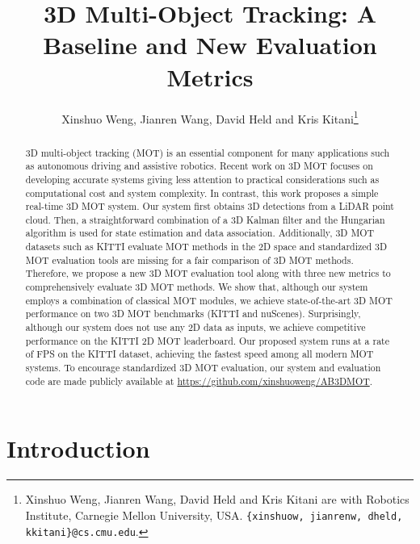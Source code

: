 \documentclass[letterpaper, 10 pt, conference]{ieeeconf}
\title{\LARGE \bf 3D Multi-Object Tracking: A Baseline and New Evaluation Metrics}
\author{Xinshuo Weng, Jianren Wang, David Held and Kris Kitani\thanks{Xinshuo Weng, Jianren Wang, David Held and Kris Kitani are with Robotics Institute, Carnegie Mellon University, USA. {\tt\small \{xinshuow, jianrenw, dheld, kkitani\}@cs.cmu.edu}.}
\vspace{-0.2cm}
}
\begin{document}
\maketitle
\thispagestyle{empty}
\pagestyle{empty}



\begin{abstract}

3D multi-object tracking (MOT) is an essential component for many applications such as autonomous driving and assistive robotics. Recent work on 3D MOT focuses on developing accurate systems giving less attention to practical considerations such as computational cost and system complexity. In contrast, this work proposes a simple real-time 3D MOT system. Our system first obtains 3D detections from a LiDAR point cloud. Then, a straightforward combination of a 3D Kalman filter and the Hungarian algorithm is used for state estimation and data association. Additionally, 3D MOT datasets such as KITTI evaluate MOT methods in the 2D space and standardized 3D MOT evaluation tools are missing for a fair comparison of 3D MOT methods. Therefore, we propose a new 3D MOT evaluation tool along with three new metrics to comprehensively evaluate 3D MOT methods. We show that, although our system employs a combination of classical MOT modules, we achieve state-of-the-art 3D MOT performance on two 3D MOT benchmarks (KITTI and nuScenes). Surprisingly, although our system does not use any 2D data as inputs, we achieve competitive performance on the KITTI 2D MOT leaderboard. Our proposed system runs at a rate of  FPS on the KITTI dataset, achieving the fastest speed among all modern MOT systems. To encourage standardized 3D MOT evaluation, our system and evaluation code are made publicly available at \url{https://github.com/xinshuoweng/AB3DMOT}.

\end{abstract}



\section{Introduction}
\vspace{-0.1cm}
\end{document}

